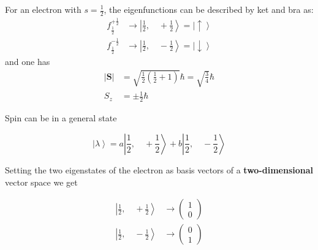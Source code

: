 For an electron with $s=\frac{1}{2}$, the eigenfunctions can be described by ket and bra as:
\begin{align*}
    f_{\frac{1}{2}}^{+\frac{1}{2}} & \rightarrow\left|\frac{1}{2},\quad +\frac{1}{2}\right>= \left|\uparrow\right>   \\
    f_{\frac{1}{2}}^{-\frac{1}{2}} & \rightarrow\left|\frac{1}{2},\quad-\frac{1}{2}\right> = \left|\downarrow\right>
\end{align*}
and one has
\begin{align*}
    |\mathbf{S}| & =\sqrt{\frac{1}{2}\left(\frac{1}{2}+1\right)}\hbar=\sqrt{\frac{3}{4}}\hbar \\
    S_z          & =\pm \frac{1}{2}\hbar
\end{align*}


Spin can be in a general state

\begin{equation*}
    \left|\lambda\right>=a\left|\frac{1}{2},\quad +\frac{1}{2}\right>+b\left|\frac{1}{2},\quad -\frac{1}{2}\right>
\end{equation*}

Setting the two eigenstates of the electron as basis vectors of a \textbf{two-dimensional} vector space we get

\begin{align*}
    \left|\frac{1}{2},\quad +\frac{1}{2}\right> & \rightarrow \left(\begin{matrix}
                                                                            1 \\
                                                                            0
                                                                        \end{matrix}\right) \\
    \left|\frac{1}{2},\quad -\frac{1}{2}\right> & \rightarrow \left(\begin{matrix}
                                                                            0 \\
                                                                            1
                                                                        \end{matrix}\right)
\end{align*}



